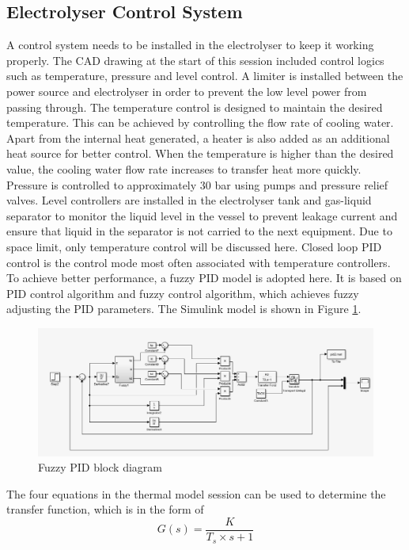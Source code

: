 \documentclass[11pt, a4paper]{article}
\begin{document}
\subsection{Electrolyser Control System}
A control system needs to be installed in the electrolyser to keep it working properly. The CAD drawing at the start of this session included control logics such as temperature, pressure and level control.  A limiter is installed between the power source and electrolyser in order to prevent the low level power from passing through. The temperature control is designed to maintain the desired temperature. This can be achieved by controlling the flow rate of cooling water. Apart from the internal heat generated, a heater is also added as an additional heat source for better control. When the temperature is higher than the desired value, the cooling water flow rate increases to transfer heat more quickly.  Pressure is controlled to approximately 30 bar using pumps and pressure relief valves. Level controllers are installed in the electrolyser tank and gas-liquid separator to monitor the liquid level in the vessel to prevent leakage current and ensure that liquid in the separator is not carried to the next equipment. Due to space limit, only temperature control will be discussed here. Closed loop PID control is the control mode most often associated with temperature controllers.\cite{control} To achieve better performance, a fuzzy PID model is adopted here. It is based on PID control algorithm and fuzzy control algorithm, which achieves fuzzy adjusting the PID parameters.\cite{fuzzy} The Simulink model is shown in Figure \ref{fig:pid}. 
\begin{figure}[H]
\includegraphics[with=10cm]{fuzzypid.png}
\caption{Fuzzy PID block diagram}
\label{fig:pid}
\end{figure}
The four equations in the thermal model session can be used to determine the transfer function, which is in the form of 
\begin{equation}
G(s) = \frac{K}{T_s\times s +1} 
\end{equation}
\end{document}
